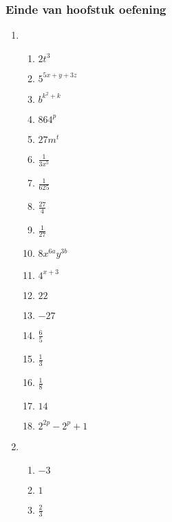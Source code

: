 {\begin{multicols}{3}
  \subsubsection*{Einde van hoofstuk oefening} %
  \begin{enumerate}[label=\textbf{\arabic*}., noitemsep]
  \item %
    \begin{enumerate}[label=\textbf{(\alph*)}, itemsep=1pt]
    \item $2t^3$%
    \item $5^{5x+y+3z}$%
    \item $b^{k^{2}+k}$%
    \item $864^p$%
    \item $27m^t$%
    \item $\frac{1}{3x^5}$%
    \item $\frac{1}{625}$%
    \item $\frac{27}{4}$%
    \item $\frac{1}{27}$%
    \item $8x^{6a}y^{3b}$%
    \item $4^{x+3}$%
    \item $22$%
    \item $-27$%
    \item $\frac{6}{5}$%
    \item $\frac{1}{3}$%
    \item $\frac{1}{8}$%
    \item $14$%
    \item $2^{2p}-2^p+1$%
    \end{enumerate}
  \item %
    \begin{enumerate}[label=\textbf{(\alph*)}, itemsep=1pt]
    \item $-3$%
    \item $1$%
    \item $\frac{2}{3}$%

\end{enumerate}
\end{enumerate}
\end{multicols}}
